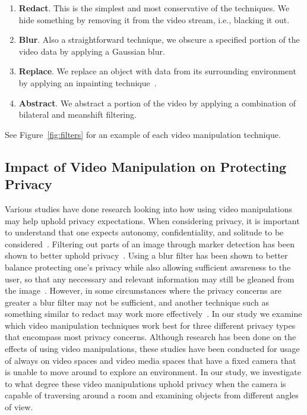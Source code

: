 \documentclass{acm_proc_article-sp}
\begin{document}
\begin{enumerate}
  \item \textbf{Redact}.  This is the simplest and most conservative of the techniques.  We hide something by removing it from the video stream, i.e., blacking it out.
  \item \textbf{Blur}.  Also a straightforward technique, we obscure a specified portion of the video data by applying a Gaussian blur.
  \item \textbf{Replace}.  We replace an object with data from its surrounding environment by applying an inpainting technique~\cite{Telea:2004}.
  \item \textbf{Abstract}.  We abstract a portion of the video by applying a combination of bilateral and meanshift filtering.
\end{enumerate}

See Figure~\ref{fig:filters} for an example of each video manipulation technique.

\subsection{Impact of Video Manipulation on Protecting Privacy}
Various studies have done research looking into how using video manipulations may help uphold privacy expectations. When considering privacy, it is important to understand that one expects autonomy, confidentiality, and solitude to be considered~\cite{Boyle:2009}. Filtering out parts of an image through marker detection has been shown to better uphold privacy~\cite{Schiff:2007}. Using a blur filter has been shown to better balance protecting one's privacy while also allowing sufficient awareness to the user, so that any neccessary and relevant information may still be gleaned from the image~\cite{Kim:2007, Boyle:2000}. However, in some circumstances where the privacy concerns are greater a blur filter may not be sufficient, and another technique such as something similar to redact may work more effectively~\cite{Edgcomb:2012}. In our study we examine which video manipulation techniques work best for three different privacy types that encompass most privacy concerns. Although research has been done on the effects of using video manipulations, these studies have been conducted for usage of always on video spaces and video media spaces that have a fixed camera that is unable to move around to explore an environment. In our study, we investigate to what degree these video manipulations uphold privacy when the camera is capable of traversing around a room and examining objects from different angles of view. 
\end{document}
